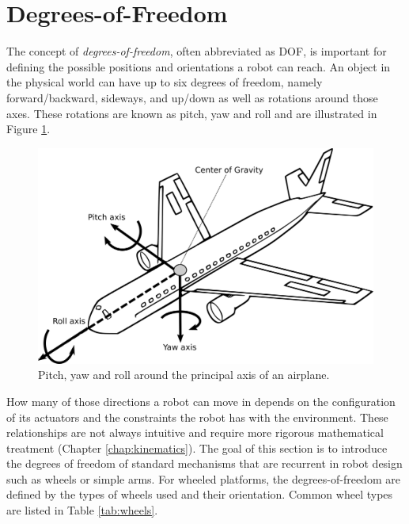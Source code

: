 \section{Degrees-of-Freedom}\label{sec:dof}
The concept of \emph{degrees-of-freedom}, often abbreviated as DOF, is important for defining the possible positions and orientations a robot can reach. An object in the physical world can have up to six degrees of freedom, namely forward/backward, sideways, and up/down as well as rotations around those axes. These rotations are known as pitch, yaw and roll and are illustrated in Figure \ref{fig:pitchyawandroll}. 

\begin{figure}
	\centering
		\includegraphics[width=\textwidth]{figs/pitchyawroll.png}
	\caption{Pitch, yaw and roll around the principal axis of an airplane.}
	\label{fig:pitchyawandroll}
\end{figure}

How many of those directions a robot can move in depends on the configuration of its actuators and the constraints the robot has with the environment. These relationships are not always intuitive and require more rigorous mathematical treatment (Chapter \ref{chap:kinematics}). The goal of this section is to introduce the degrees of freedom of standard mechanisms that are recurrent in robot design such as wheels or simple arms. For wheeled platforms, the degrees-of-freedom are defined by the types of wheels used and their orientation. Common wheel types are listed in Table \ref{tab:wheels}.

